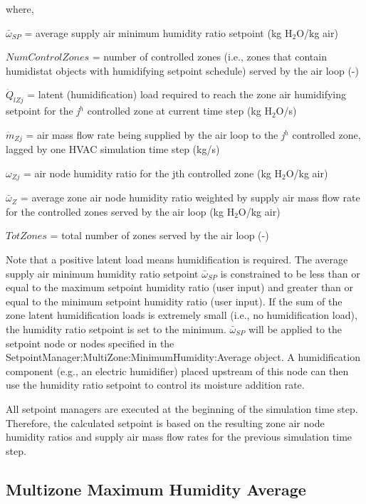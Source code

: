 where,

\({\bar \omega_{SP}}\) = average supply air minimum humidity ratio setpoint (kg H\(_{2}\)O/kg air)

\(NumControlZones\) = number of controlled zones (i.e., zones that contain humidistat objects with humidifying setpoint schedule) served by the air loop (-)

\({\dot Q_{lZj}}\) = latent (humidification) load required to reach the zone air humidifying setpoint for the \emph{j}\(^{h}\) controlled zone at current time step (kg H\(_{2}\)O/s)

\({\dot m_{Zj}}\) = air mass flow rate being supplied by the air loop to the \emph{j}\(^{h}\) controlled zone, lagged by one HVAC simulation time step (kg/s)

\({\omega_{Zj}}\) = air node humidity ratio for the jth controlled zone (kg H\(_{2}\)O/kg air)

\({\bar \omega_Z}\) = average zone air node humidity ratio weighted by supply air mass flow rate for the controlled zones served by the air loop (kg H\(_{2}\)O/kg air)

\(TotZones\) = total number of zones served by the air loop (-)

Note that a positive latent load means humidification is required. The average supply air minimum humidity ratio setpoint \({\bar \omega_{SP}}\) is constrained to be less than or equal to the maximum setpoint humidity ratio (user input) and greater than or equal to the minimum setpoint humidity ratio (user input). If the sum of the zone latent humidification loads is extremely small (i.e., no humidification load), the humidity ratio setpoint is set to the minimum. \({\bar \omega_{SP}}\) will be applied to the setpoint node or nodes specified in the SetpointManager:MultiZone:MinimumHumidity:Average object. A humidification component (e.g., an electric humidifier) placed upstream of this node can then use the humidity ratio setpoint to control its moisture addition rate.

All setpoint managers are executed at the beginning of the simulation time step. Therefore, the calculated setpoint is based on the resulting zone air node humidity ratios and supply air mass flow rates for the previous simulation time step.

\subsection{Multizone Maximum Humidity Average}\label{multizone-maximum-humidity-average}

